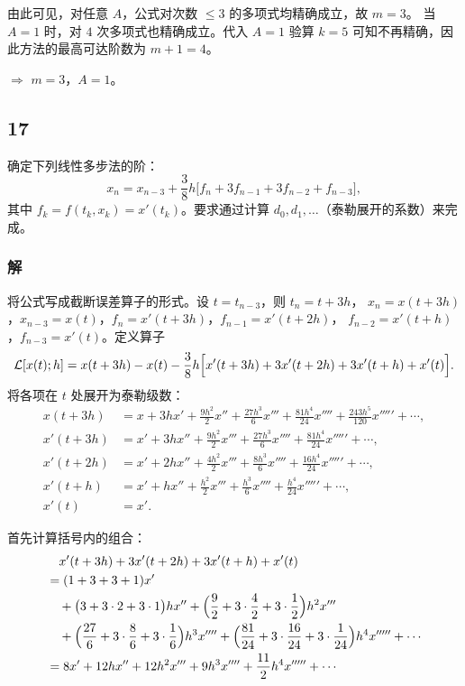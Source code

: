 \documentclass{article}
\begin{document}
由此可见，对任意 $A$，公式对次数 $\le 3$ 的多项式均精确成立，故 $m = 3$。
当 $A = 1$ 时，对 $4$ 次多项式也精确成立。代入 $A = 1$ 验算 $k = 5$ 可知不再精确，因此方法的最高可达阶数为 $m+1 = 4$。

$\Rightarrow$ $m = 3$，$A = 1$。

\subsection*{17}

确定下列线性多步法的阶：
\[
x_n = x_{n-3} + \frac{3}{8} h\bigl[f_n + 3f_{n-1} + 3f_{n-2} + f_{n-3}\bigr],
\]
其中 $f_k = f(t_k, x_k) = x'(t_k)$。要求通过计算 $d_0, d_1, \ldots$（泰勒展开的系数）来完成。

\subsubsection*{解}
将公式写成截断误差算子的形式。设 $t = t_{n-3}$，则 $t_n = t + 3h$，
$x_n = x(t + 3h)$，$x_{n-3} = x(t)$，$f_n = x'(t + 3h)$，$f_{n-1} = x'(t + 2h)$，
$f_{n-2} = x'(t + h)$，$f_{n-3} = x'(t)$。定义算子
\[
\mathcal{L}[x(t); h] = x(t+3h) - x(t) 
- \frac{3}{8}h\Bigl[x'(t+3h) + 3x'(t+2h) + 3x'(t+h) + x'(t)\Bigr].
\]
将各项在 $t$ 处展开为泰勒级数：
\begin{align*}
x(t+3h) &= x + 3h x' + \frac{9h^2}{2} x'' + \frac{27h^3}{6} x''' + \frac{81h^4}{24} x'''' + \frac{243h^5}{120} x''''' + \cdots,\\
x'(t+3h) &= x' + 3h x'' + \frac{9h^2}{2} x''' + \frac{27h^3}{6} x'''' + \frac{81h^4}{24} x''''' + \cdots,\\
x'(t+2h) &= x' + 2h x'' + \frac{4h^2}{2} x''' + \frac{8h^3}{6} x'''' + \frac{16h^4}{24} x''''' + \cdots,\\
x'(t+h) &= x' + h x'' + \frac{h^2}{2} x''' + \frac{h^3}{6} x'''' + \frac{h^4}{24} x''''' + \cdots,\\
x'(t) &= x'.
\end{align*}

首先计算括号内的组合：
\begin{align*}
&\quad x'(t+3h) + 3x'(t+2h) + 3x'(t+h) + x'(t)\\
&= (1+3+3+1)x' \\
&\quad + \bigl(3 + 3\cdot 2 + 3\cdot 1\bigr)h x'' 
   + \Bigl(\frac{9}{2} + 3\cdot\frac{4}{2} + 3\cdot\frac{1}{2}\Bigr)h^2 x''' \\
&\quad + \Bigl(\frac{27}{6} + 3\cdot\frac{8}{6} + 3\cdot\frac{1}{6}\Bigr)h^3 x''''
   + \Bigl(\frac{81}{24} + 3\cdot\frac{16}{24} + 3\cdot\frac{1}{24}\Bigr)h^4 x''''' + \cdots\\
&= 8x' + 12h x'' + 12h^2 x''' + 9h^3 x'''' + \frac{11}{2}h^4 x''''' + \cdots
\end{align*}
\end{document}
